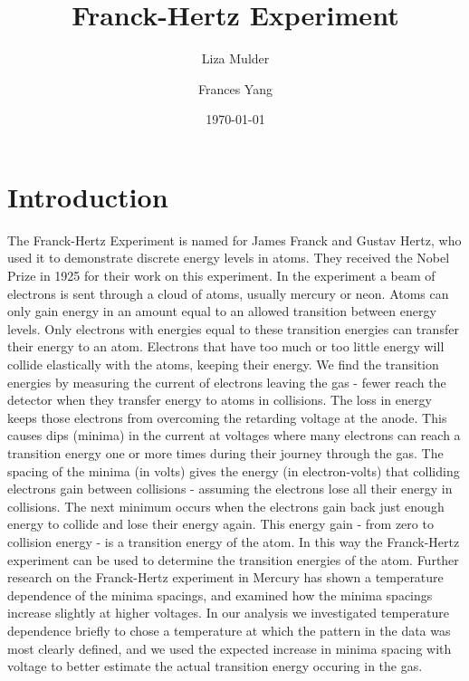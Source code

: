 \documentclass[prb,preprint]{revtex4-1}
\begin{document}

\title{Franck-Hertz Experiment}


\author{Liza Mulder}


\author{Frances Yang}


\date{\today}



\begin{abstract}

\end{abstract}

\maketitle

\section{Introduction} 

The Franck-Hertz Experiment is named for James Franck and Gustav Hertz, who used it to demonstrate discrete energy levels in atoms. 
They received the Nobel Prize in 1925 for their work on this experiment. 
In the experiment a beam of electrons is sent through a cloud of atoms, usually mercury or neon. 
Atoms can only gain energy in an amount equal to an allowed transition between energy levels. 
Only electrons with energies equal to these transition energies can transfer their energy to an atom. 
Electrons that have too much or too little energy will collide elastically with the atoms, keeping their energy. 
We find the transition energies by measuring the current of electrons leaving the gas - fewer reach the detector when they transfer energy to atoms in collisions. 
The loss in energy keeps those electrons from overcoming the retarding voltage at the anode. 
This causes dips (minima) in the current at voltages where many electrons can reach a transition energy one or more times during their journey through the gas. 
The spacing of the minima (in volts) gives the energy (in electron-volts) that colliding electrons gain between collisions - assuming the electrons lose all their energy in collisions. 
The next minimum occurs when the electrons gain back just enough energy to collide and lose their energy again. 
This energy gain - from zero to collision energy - is a transition energy of the atom. 
In this way the Franck-Hertz experiment can be used to determine the transition energies of the atom. 
Further research on the Franck-Hertz experiment in Mercury has shown a temperature dependence of the minima spacings, and examined how the minima spacings increase slightly at higher voltages. 
In our analysis we investigated temperature dependence briefly to chose a temperature at which the pattern in the data was most clearly defined, and we used the expected increase in minima spacing with voltage to better estimate the actual transition energy occuring in the gas. 
\end{document}
